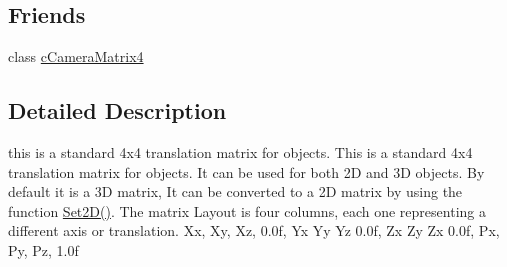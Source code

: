 \subsection*{Friends}
\begin{DoxyCompactItemize}
\item 
\hypertarget{classc_matrix4_ad892cad8874ae954d2e9de55b17ded93}{
class \hyperlink{classc_matrix4_ad892cad8874ae954d2e9de55b17ded93}{cCameraMatrix4}}
\label{classc_matrix4_ad892cad8874ae954d2e9de55b17ded93}

\end{DoxyCompactItemize}


\subsection{Detailed Description}
this is a standard 4x4 translation matrix for objects. This is a standard 4x4 translation matrix for objects. It can be used for both 2D and 3D objects. By default it is a 3D matrix, It can be converted to a 2D matrix by using the function \hyperlink{classc_matrix4_ad24236403317622459c3309938be9d21}{Set2D()}. The matrix Layout is four columns, each one representing a different axis or translation. Xx, Xy, Xz, 0.0f, Yx Yy Yz 0.0f, Zx Zy Zx 0.0f, Px, Py, Pz, 1.0f 